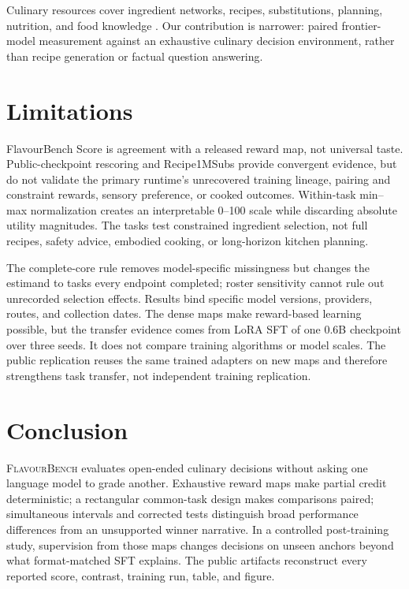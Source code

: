\documentclass{article}
\newcommand{\system}{\textsc{FlavourBench}}
\begin{document}
Culinary resources cover ingredient networks, recipes, substitutions, planning, nutrition, and
food knowledge \citep{ahn2011flavor,garg2018flavordb,salvador2017recipe1m,
fatemi2023substitute,choi2024cookingsense,wu2025recipe2plan,hua2025nutribench,
eftimov2026foodbench,jin2026diningbench}. Our contribution is narrower: paired frontier-model
measurement against an exhaustive culinary decision environment, rather than recipe generation or
factual question answering.

\section{Limitations}

FlavourBench Score is agreement with a released reward map, not universal taste. Public-checkpoint
rescoring and Recipe1MSubs provide convergent evidence, but do not validate the primary runtime's
unrecovered training lineage, pairing and constraint rewards, sensory preference, or cooked
outcomes. Within-task min--max normalization creates an interpretable 0--100 scale while discarding
absolute utility magnitudes. The tasks test constrained ingredient selection, not full recipes,
safety advice, embodied cooking, or long-horizon kitchen planning.

The complete-core rule removes model-specific missingness but changes the estimand to tasks every
endpoint completed; roster sensitivity cannot rule out unrecorded selection effects. Results bind
specific model versions, providers, routes, and collection dates. The dense maps make reward-based
learning possible, but the transfer evidence comes from LoRA SFT of one 0.6B checkpoint over three
seeds. It does not compare training algorithms or model scales. The public replication reuses the
same trained adapters on new maps and therefore strengthens task transfer, not independent training
replication.

\section{Conclusion}

\system{} evaluates open-ended culinary decisions without asking one language model to grade
another. Exhaustive reward maps make partial credit deterministic; a rectangular common-task
design makes comparisons paired; simultaneous intervals and corrected tests distinguish broad
performance differences from an unsupported winner narrative. In a controlled post-training
study, supervision from those maps changes decisions on unseen anchors beyond what format-matched
SFT explains. The public artifacts reconstruct every reported score, contrast, training run, table,
and figure.
\end{document}
